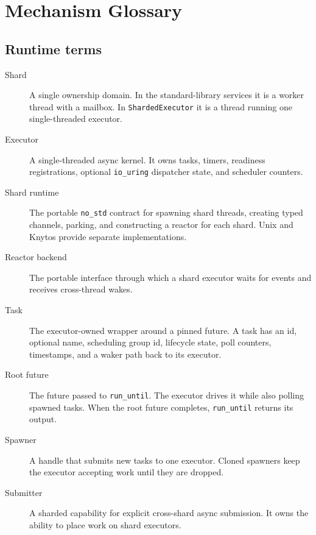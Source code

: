 \chapter{Mechanism Glossary}
\label{chap:glossary}

\section{Runtime terms}

\begin{description}
    \item[Shard] A single ownership domain. In the standard-library services it
        is a worker thread with a mailbox. In \texttt{ShardedExecutor} it is a
        thread running one single-threaded executor.

    \item[Executor] A single-threaded async kernel. It owns tasks, timers,
        readiness registrations, optional \texttt{io\_uring} dispatcher state,
        and scheduler counters.

    \item[Shard runtime] The portable \texttt{no\_std} contract for spawning
        shard threads, creating typed channels, parking, and constructing a
        reactor for each shard. Unix and Knytos provide separate
        implementations.

    \item[Reactor backend] The portable interface through which a shard
        executor waits for events and receives cross-thread wakes.

    \item[Task] The executor-owned wrapper around a pinned future. A task has
        an id, optional name, scheduling group id, lifecycle state, poll
        counters, timestamps, and a waker path back to its executor.

    \item[Root future] The future passed to \texttt{run\_until}. The executor
        drives it while also polling spawned tasks. When the root future
        completes, \texttt{run\_until} returns its output.

    \item[Spawner] A handle that submits new tasks to one executor. Cloned
        spawners keep the executor accepting work until they are dropped.

    \item[Submitter] A sharded capability for explicit cross-shard async
        submission. It owns the ability to place work on shard executors.


\end{description}
